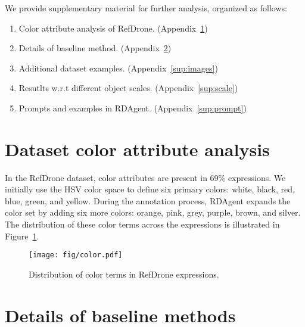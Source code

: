
\clearpage

\setcounter{page}{1}


\maketitlesupplementary
\appendix

\noindent We provide supplementary material for further analysis, organized as follows:
\begin{enumerate}
    \item Color attribute analysis of RefDrone. (Appendix~\ref{sup:color})
    \item Details of baseline method. (Appendix~\ref{sup:baseline})
    \item Additional dataset examples. (Appendix~\ref{sup:images})
    \item Resutlts w.r.t different object scales. (Appendix~\ref{sup:scale})
    \item Prompts and examples in RDAgent. (Appendix~\ref{sup:prompt})

\end{enumerate}



\section{Dataset color attribute analysis}
\label{sup:color}

In the RefDrone dataset, color attributes are present in 69\% expressions. We initially use the HSV color space to define six primary colors: white, black, red, blue, green, and yellow. During the annotation process, RDAgent expands the color set by adding six more colors: orange, pink, grey, purple, brown, and silver. The distribution of these color terms across the expressions is illustrated in Figure~\ref{fig:color}.


\begin{figure}[h]
\centering
\texttt{[image: fig/color.pdf]}
\caption{Distribution of color terms in RefDrone expressions.} 
\label{fig:color}
\end{figure}



\section{Details of baseline methods}
\label{sup:baseline}

